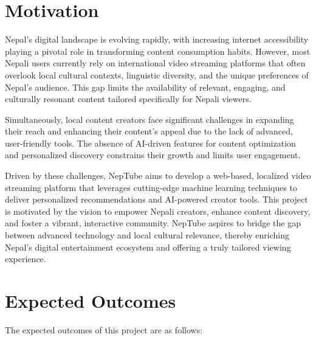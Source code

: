 \section{Motivation}

Nepal's digital landscape is evolving rapidly, with increasing internet accessibility playing a pivotal role in transforming content consumption habits. However, most Nepali users currently rely on international video streaming platforms that often overlook local cultural contexts, linguistic diversity, and the unique preferences of Nepal's audience. This gap limits the availability of relevant, engaging, and culturally resonant content tailored specifically for Nepali viewers.

Simultaneously, local content creators face significant challenges in expanding their reach and enhancing their content's appeal due to the lack of advanced, user-friendly tools. The absence of AI-driven features for content optimization and personalized discovery constrains their growth and limits user engagement.

Driven by these challenges, NepTube aims to develop a web-based, localized video streaming platform that leverages cutting-edge machine learning techniques \cite{gomezuribe2016netflix} to deliver personalized recommendations and AI-powered creator tools. This project is motivated by the vision to empower Nepali creators, enhance content discovery, and foster a vibrant, interactive community. NepTube aspires to bridge the gap between advanced technology and local cultural relevance, thereby enriching Nepal's digital entertainment ecosystem and offering a truly tailored viewing experience.

\section{Expected Outcomes}

The expected outcomes of this project are as follows:

